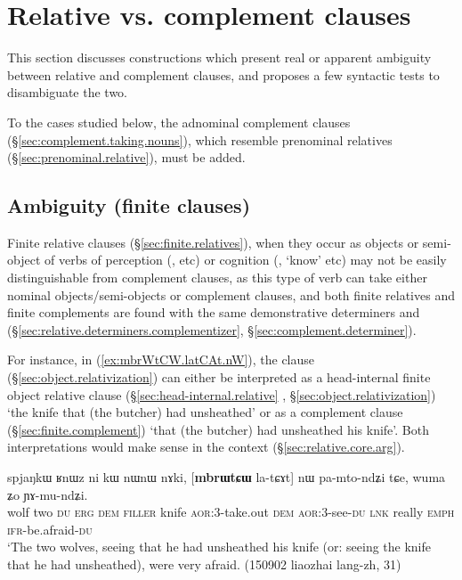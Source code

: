  
\section{Relative vs. complement clauses}  \label{sec:relative.complement.ambiguities}
This section discusses constructions which present real or apparent ambiguity between relative and complement clauses, and proposes a few syntactic tests to disambiguate the two.

To the cases studied below, the adnominal complement clauses (§\ref{sec:complement.taking.nouns}), which resemble prenominal relatives (§\ref{sec:prenominal.relative}), must be added.


\subsection{Ambiguity (finite clauses)} \label{sec:finite.relative.complement.ambiguity}
Finite relative clauses (§\ref{sec:finite.relatives}), when they occur as objects or semi-object of verbs of perception (,  etc) or cognition (, `know' etc) may not be easily distinguishable from complement clauses, as this type of verb can take either nominal objects/semi-objects or complement clauses, and both finite relatives and finite complements are found with the same demonstrative determiners  and  (§\ref{sec:relative.determiners.complementizer}, §\ref{sec:complement.determiner}).

For instance, in (\ref{ex:mbrWtCW.latCAt.nW}), the clause  (§\ref{sec:object.relativization}) can either be interpreted as a head-internal finite object relative clause (§\ref{sec:head-internal.relative} , §\ref{sec:object.relativization}) `the knife that (the butcher) had unsheathed' or as a complement clause (§\ref{sec:finite.complement}) `that (the butcher) had unsheathed his knife'. Both interpretations would make sense in the context (§\ref{sec:relative.core.arg}).

\begin{exe}
\ex \label{ex:mbrWtCW.latCAt.nW}
\gll spjaŋkɯ ʁnɯz ni kɯ nɯnɯ nɤki, [\textbf{mbrɯtɕɯ} la-tɕɤt] nɯ pa-mto-ndʑi tɕe, wuma ʑo ɲɤ-mu-ndʑi. \\
wolf two \textsc{du} \textsc{erg} \textsc{dem} \textsc{filler} knife \textsc{aor}:3\flobv{}-take.out \textsc{dem} \textsc{aor}:3\flobv{}-see-\textsc{du} \textsc{lnk} really \textsc{emph} \textsc{ifr}-be.afraid-\textsc{du} \\
\glt `The two wolves, seeing that he had unsheathed his knife (or: seeing the knife that he had unsheathed), were very afraid. (150902 liaozhai lang-zh, 31)
\end{exe}

